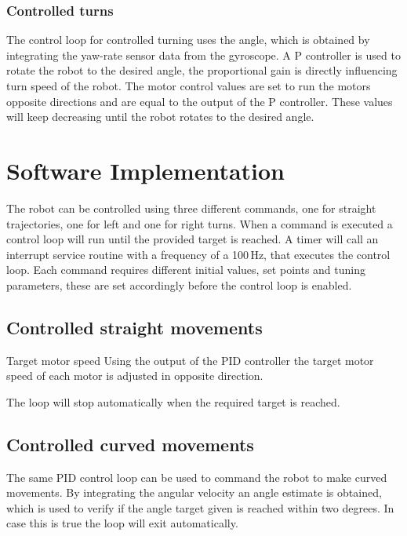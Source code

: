 \subsubsection{Controlled turns}

The control loop for controlled turning uses the angle, which is obtained by integrating the yaw-rate sensor data from the gyroscope.
A P controller is used to rotate the robot to the desired angle, the proportional gain is directly influencing turn speed of the robot.
The motor control values are set to run the motors opposite directions and are equal to the output of the P controller.
These values will keep decreasing until the robot rotates to the desired angle.

\section{Software Implementation}

The robot can be controlled using three different commands, one for straight trajectories, one for left and one for right turns.
When a command is executed a control loop will run until the provided target is reached.
A timer will call an interrupt service routine with a frequency of a 100\,Hz, that executes the control loop.   
Each command requires different initial values, set points and tuning parameters, these are set accordingly before the control loop is enabled.

\subsection{Controlled straight movements}

Target motor speed 
Using the output of the PID controller the target motor speed of each motor is adjusted in opposite direction.

The loop will stop automatically when the required target is reached.

\subsection{Controlled curved movements}
The same PID control loop can be used to command the robot to make curved movements.
By integrating the angular velocity an angle estimate is obtained, which is used to verify if the angle target given is reached within two degrees.
In case this is true the loop will exit automatically.

